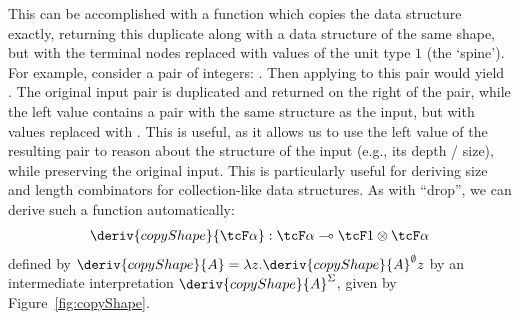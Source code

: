 This can be accomplished with a function which copies the data structure
exactly, returning this duplicate along with a data structure of the same shape,
but with the terminal nodes replaced with values of the unit type $1$  (the
`spine'). For example, consider a pair of integers: . Then
applying  to this pair would yield . The original input pair is duplicated and returned on the right of the
pair, while the left value contains a pair with the same structure as the input,
but with values replaced with \granin{()}. This is useful, as it allows us to
use the left value of the resulting pair to reason about the structure of the
input (e.g., its depth / size), while preserving the original input. This is
particularly useful for deriving size and length combinators for collection-like
data structures.
\noindent
As with ``drop'', we can derive such a
function automatically:
\begin{align*}
\deriv{copyShape}{\tcF \alpha} : \tcF \alpha \multimap \tcF 1 \otimes \tcF \alpha
\end{align*}
defined by
$\deriv{copyShape}{A} = \lambda z . \deriv{copyShape}{A}^\emptyset z$
by an intermediate interpretation $\deriv{copyShape}{A}^\Sigma$, given by Figure~\ref{fig:copyShape}.
%
